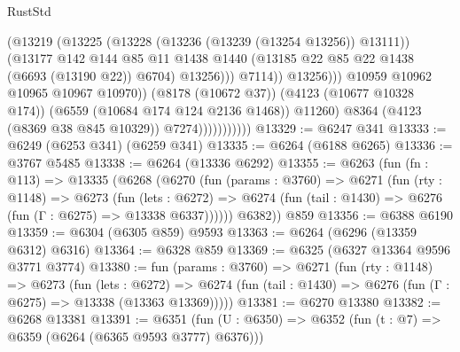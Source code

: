 \begin{lexlean}{RustStd}
\begin{coremodule}
                                          (@13219
                                            (@13225
                                              (@13228 (@13236 (@13239 (@13254 @13256)) @13111))
                                              (@13177
                                                @142
                                                @144
                                                @85
                                                @11
                                                @1438
                                                @1440
                                                (@13185
                                                  @22
                                                  @85
                                                  @22
                                                  @1438
                                                  (@6693 (@13190 @22))
                                                  @6704)
                                                @13256)))
                                          @7114))
                                      @13256)))
                                @10959
                                @10962
                                @10965
                                @10967
                                @10970))
                            (@8178 (@10672 @37))
                            (@4123 (@10677 @10328 @174))
                            (@6559 (@10684 @174 @124 @2136 @1468))
                            @11260)
                          @8364
                          (@4123 (@8369 @38 @845 @10329))
                          @7274)))))))))))
@13329 := @6247 @341
@13333 := @6249 (@6253 @341) (@6259 @341)
@13335 := @6264 (@6188 @6265)
@13336 := @3767 @5485
@13338 := @6264 (@13336 @6292)
@13355 := @6263
    (fun (fn : @113) =>
    @13335
      (@6268
        (@6270
          (fun (params : @3760) =>
          @6271
            (fun (rty : @1148) =>
            @6273
              (fun (lets : @6272) =>
              @6274 (fun (tail : @1430) => @6276 (fun (Γ : @6275) => @13338 @6337))))))
        @6382))
    @859
@13356 := @6388 @6190
@13359 := @6304 (@6305 @859) @9593
@13363 := @6264 (@6296 (@13359 @6312) @6316)
@13364 := @6328 @859
@13369 := @6325 (@6327 @13364 @9596 @3771 @3774)
@13380 := fun (params : @3760) =>
  @6271
    (fun (rty : @1148) =>
    @6273
      (fun (lets : @6272) =>
      @6274 (fun (tail : @1430) => @6276 (fun (Γ : @6275) => @13338 (@13363 @13369)))))
@13381 := @6270 @13380
@13382 := @6268 @13381
@13391 := @6351 (fun (U : @6350) => @6352 (fun (t : @7) => @6359 (@6264 (@6365 @9593 @3777) @6376)))

\end{coremodule}
\end{lexlean}
